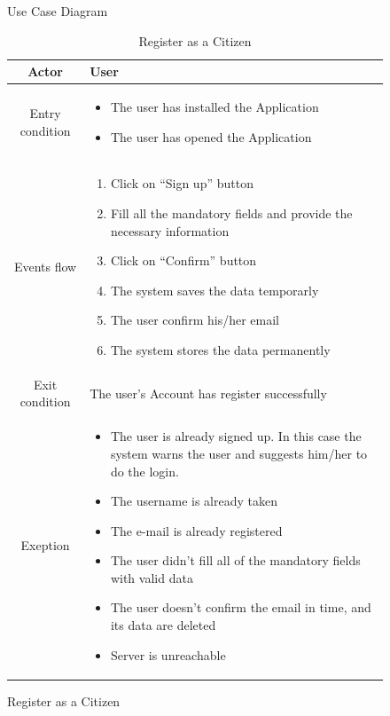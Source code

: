 \documentclass{article}
\begin{document}
	\begin{figure}[H]
		\centering
		\def\svgwidth{\columnwidth}
		
		\caption{Use Case Diagram}
	\end{figure}

		
		
	\begin{figure}[H]
	
		\begin{table} [H]
		\begin{center}
		\caption{Register as a Citizen}
		\begin{tabular}{|c|p{8cm}|}
			\hline
			Actor			&	User\\
			\hline
			Entry condition	&	\begin{itemize}[noitemsep,topsep=0pt]
									\item The user has installed the Application
									\item The user has opened the Application
								\end{itemize}\\
			\hline
			Events flow 		& 	\begin{enumerate}[noitemsep,topsep=0pt]
									\item Click on “Sign up” button
									\item Fill all the mandatory fields and provide the
									 necessary information
									\item Click on “Confirm” button
									\item The system saves the data temporarly
									\item The user confirm his/her email
									\item The system stores the data permanently
								\end{enumerate}\\
			\hline
			Exit condition	& 	The user's Account has register successfully\\
			\hline
			Exeption 		& 	\begin{itemize}[noitemsep,topsep=0pt]
									\item The user is already signed up.
									In this case the system warns the user and suggests
									 him/her to do the login.
									\item The username is already taken
									\item The e-mail is already registered
									\item The user didn’t fill all of the mandatory fields 
									with valid data
									\item The user doesn't confirm the email in time, 
									and its data are deleted
									\item Server is unreachable
								\end{itemize}\\
			\hline
		\end{tabular}	
		\end{center}
		\end{table} 
	

\end{figure}
\end{document}
